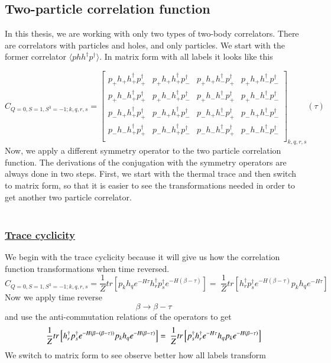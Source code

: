 \subsection{Two-particle correlation function}
\label{ssec:sym-twobody}
In this thesis, we are working with only two types of two-body correlators. There are correlators with particles and holes, and only particles. We start with the former correlator $\langle phh^\dagger p^\dagger\rangle$. In matrix form with all labels it looks like this

\newcommand{\cor}[4]{p_{#1}h_{#2}h^\dagger_{#3}p^\dagger_{#4}}
\begin{equation}
  C_{Q=0,S=1,S^3=-1;k,q,r,s} =
  \left[
  \begin{array}{cccc}
    \cor{+}{+}{+}{+} & \cor{+}{+}{+}{-} & \cor{+}{+}{-}{+} & \cor{+}{+}{-}{-} \\
    \cor{+}{-}{+}{+} & \cor{+}{-}{+}{-} & \cor{+}{-}{-}{+} & \cor{+}{-}{-}{-} \\
    \cor{-}{+}{+}{+} & \cor{-}{+}{+}{-} & \cor{-}{+}{-}{+} & \cor{-}{+}{-}{-} \\
    \cor{-}{-}{+}{+} & \cor{-}{-}{+}{-} & \cor{-}{-}{-}{+} & \cor{-}{-}{-}{-} \\
  \end{array}
  \right]_{k,q,r,s} (\tau)
\end{equation}
Now, we apply a different symmetry operator to the two particle correlation function. The derivations of the conjugation with the symmetry operators are always done in two steps. First, we start with the thermal trace and then switch to matrix form, so that it is easier to see the transformations needed in order to get another two particle correlator.
\\
\\
\subsubsection{\underline{Trace cyclicity}}
We begin with the trace cyclicity because it will give us how the correlation function transformations when time reversed.
\\
\begin{equation}
  C_{Q=0,S=1,S^3=-1;k,q,r,s} = \frac{1}{Z}tr\left[p_kh_qe^{-H\tau}h^\dagger_rp^\dagger_se^{-H\left(\beta-\tau\right)}\right] =\
  \frac{1}{Z}tr\left[h^\dagger_rp^\dagger_se^{-H\left(\beta-\tau\right)}p_kh_qe^{-H\tau}\right]
\end{equation}
Now we apply time reverse
$$\beta \rightarrow \beta - \tau$$
and use the anti-commutation relations of the operators to get
\begin{equation}
  \frac{1}{Z}tr\left[h^\dagger_rp^\dagger_se^{-H\left(\beta-\left(\beta-\tau\right)\right)}p_kh_qe^{-H\left(\beta-\tau\right)}\right]=\\\
  \frac{1}{Z}tr\left[p^\dagger_sh^\dagger_re^{-H\tau}h_qp_ke^{-H\left(\beta-\tau\right)}\right]
\end{equation}
We switch to matrix form to see observe better how all labels transform

